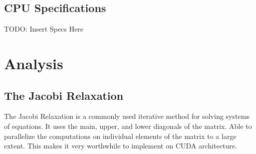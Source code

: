 \documentclass[10pt]{article}
\begin{document}
\begin{multicols}{2}
  \subsection{CPU Specifications}
  TODO: Insert Specs Here

  \section{Analysis}
  \subsection{The Jacobi Relaxation}
  The Jacobi Relaxation is a commonly used iterative method for solving systems of equations.
  It uses the main, upper, and lower diagonals of the matrix.
  Able to parallelize the computations on individual elements of the matrix to a large extent.
  This makes it very worthwhile to implement on CUDA architecture.


\end{multicols}
\end{document}
